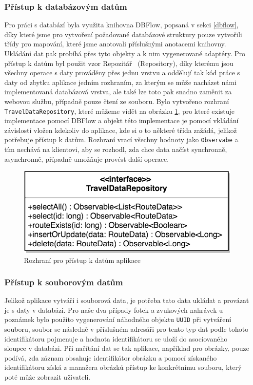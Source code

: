 \documentclass[czech,master,public,dept460,male,java,cpdeclaration]{diploma}
\begin{document}
\subsubsection{Přístup k databázovým datům}
Pro práci s databází byla využita knihovna DBFlow, popsaná v sekci \ref{dbflow}, díky které jsme pro vytvoření
požadované databázové struktury pouze vytvořili třídy pro mapování, které jsme anotovali příslušnými
anotacemi knihovny. Ukládání dat pak probíhá přes tyto objekty a k nim vygenerované adaptéry.
Pro přístup k datům byl použit vzor Repozitář~\cite{repository} (Repository), díky kterému
jsou všechny operace s daty prováděny přes jednu vrstvu a oddělují tak kód práce s daty od zbytku aplikace
jedním rozhraním, za kterým se může nacházet námi implementovaná databázová vrstva, ale také lze toto
pak snadno zaměnit za webovou službu, případně pouze čtení ze souboru.
Bylo vytvořeno rozhraní \texttt{TravelDataRepository}, které můžeme vidět na obrázku \ref{fig:traveldatarepo},
pro které existuje implementace pomocí DBFlow a objekt této implementace je pomocí vkládání závislostí vložen
kdekoliv do aplikace, kde si o to některé třída zažádá, jelikož potřebuje přístup k datům.
Rozhraní vrací všechny hodnoty jako \texttt{Observabe} a tím nechává na klientovi, aby se rozhodl, zda
chce data načíst synchronně, asynchronně, případně umožňuje provést další operace.

\begin{figure}[H]
        \centering
                \includegraphics[scale=0.2]{img/repo.png}
        \caption{Rozhraní pro přístup k datům aplikace}
        \label{fig:traveldatarepo}
\end{figure}

\subsubsection{Přístup k souborovým datům}
Jelikož aplikace vytváří i souborová data, je potřeba tato data ukládat a provázat je s daty v databázi.
Pro naše dva případy fotek a zvukových nahrávek u poznámek bylo použito vygenerování náhodného
objektu \texttt{UUID} při vytváření souboru, soubor se následně v příslušném adresáři pro tento typ
dat podle tohoto identifikátoru pojmenuje a hodnota identifikátoru se uloží do asociovaného sloupce
v databázi. Při načítání dat se tak aplikace, například pro obrázky, pouze podívá, zda záznam obsahuje
identifikátor obrázku a pomocí získaného identifikátoru získá z manažera obrázků přístup ke konkrétnímu
souboru, který poté může zobrazit uživateli.
\end{document}
